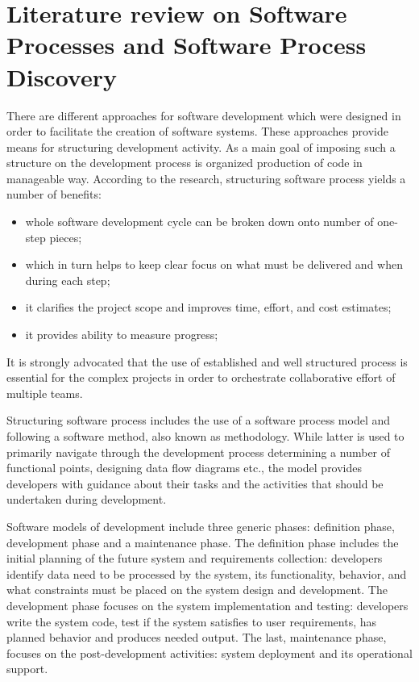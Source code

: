 \chapter{Literature review on Software Processes and Software Process Discovery}
There are different approaches for software development which were designed in order to 
facilitate the creation of software systems. These approaches provide means for 
structuring development activity. As a main goal of imposing such a structure on the 
development process is organized production of code in manageable way. 
According to the research, structuring software process yields a number of benefits:
\begin{itemize}
 \item whole software development cycle can be broken down onto number of one-step pieces;
 \item which in turn helps to keep clear focus on what must be delivered and when during each step;
 \item it clarifies the project scope and improves time, effort, and cost estimates;
 \item it provides ability to measure progress;
\end{itemize}
It is strongly advocated that the use of established and well structured process is 
essential for the complex projects in order to orchestrate collaborative effort 
of multiple teams. 

Structuring software process includes the use of a software process model and following 
a software method, also known as methodology. While latter is used to primarily navigate 
through the development process determining a number of functional points, 
designing data flow diagrams etc., the model provides developers with guidance about their 
tasks and the activities that should be undertaken during development. 

Software models of development include three generic phases: definition phase, 
development phase and a maintenance phase. 
The definition phase includes the initial planning of the future system and 
requirements collection: developers identify data need to be processed by the system, 
its functionality, behavior, and what constraints must be placed on the system design 
and development. 
The development phase focuses on the system implementation and testing: developers 
write the system code, test if the system satisfies to user requirements, 
has planned behavior and produces needed output. 
The last, maintenance phase, focuses on the post-development activities: 
system deployment and its operational support. 


